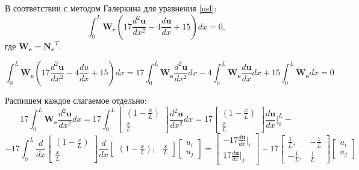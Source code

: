 В соответствии с методом Галеркина для уравнения \ref{usl}:
\begin{equation}\label{lin}
\int_0^L \mathbf{W_e}\left( 17\frac{d^2\mathbf{u}}{dx^2} -4  \frac{d\mathbf{u}}{dx}  +15 \right) d x=0,
\end{equation}
где $\mathbf{W_e=N_e}^T$.

$$\int_0^L \mathbf{W_e}\left(17\frac{d^2\mathbf{u}}{dx^2} -4  \frac{du}{dx}  +15 \right) d x= 17\int_0^L \mathbf{W_e} \frac{d^2 \mathbf{u}}{dx^2} dx  -4   \int_0^L \mathbf{W_e}\frac{d\mathbf{u}}{dx} d x   +15 \int_0^L \mathbf{W_e} d x=0$$

Распишем каждое слагаемое отдельно:
$$
17\int_0^L \mathbf{W_e} \frac{d^2 \mathbf{u}}{dx^2} dx=17\int_0^L
	\begin{bmatrix}
	(1-\frac{x}{L}) \\
	\frac{x}{L}
	\end{bmatrix}
\frac{d^2 \mathbf{u}}{dx^2} dx =
17
	\begin{bmatrix}
	(1-\frac{x}{L}) \\
	\frac{x}{L}
	\end{bmatrix}
\frac{d\mathbf{u}}{dx} |_0^L -
$$
$$
  -17  \int_0^L
\frac{d}{dx}
	\begin{bmatrix}
	(1-\frac{x}{L}) \\
	\frac{x}{L}
	\end{bmatrix}
\frac{d}{dx}
	\begin{bmatrix}
	(1-\frac{x}{L}); & \frac{x}{L}
	\end{bmatrix}
	\begin{bmatrix}
	u_i \\
	u_j
	\end{bmatrix}
=
	\begin{bmatrix}
	  -17 \frac{d\mathbf{u}}{dx}|_i \\
17\frac{d\mathbf{u}}{dx}|_j
	\end{bmatrix}   -17 
\begin{bmatrix}
\frac{1}{L}, & -\frac{1}{L} \\
-\frac{1}{L}, & \frac{1}{L}
\end{bmatrix}
\begin{bmatrix}
u_i \\
u_j
\end{bmatrix}
$$

